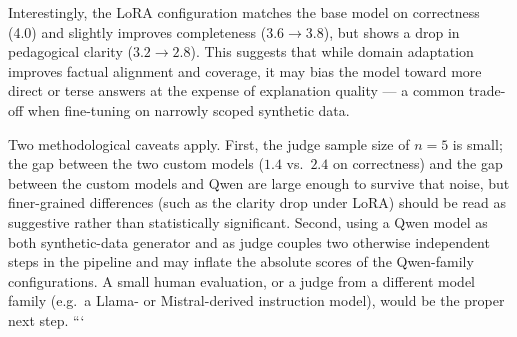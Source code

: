 Interestingly, the LoRA configuration matches the base model on correctness (4.0) and
slightly improves completeness ($3.6 \to 3.8$), but shows a drop in pedagogical clarity
($3.2 \to 2.8$). This suggests that while domain adaptation improves factual alignment
and coverage, it may bias the model toward more direct or terse answers at the expense
of explanation quality --- a common trade-off when fine-tuning on narrowly scoped
synthetic data.

Two methodological caveats apply. First, the judge sample size of $n=5$ is small;
the gap between the two custom models ($1.4$ vs.\ $2.4$ on correctness) and the gap
between the custom models and Qwen are large enough to survive that noise, but
finer-grained differences (such as the clarity drop under LoRA) should be read as
suggestive rather than statistically significant. Second, using a Qwen model as both
synthetic-data generator and as judge couples two otherwise independent steps in the
pipeline and may inflate the absolute scores of the Qwen-family configurations. A small
human evaluation, or a judge from a different model family (e.g.\ a Llama- or
Mistral-derived instruction model), would be the proper next step.
```
